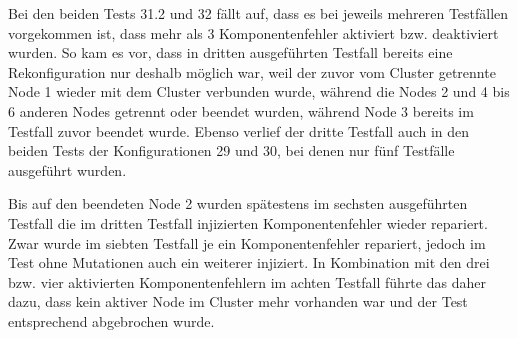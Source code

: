 Bei den beiden Tests 31.2 und 32 fällt auf, dass es bei jeweils mehreren Testfällen vorgekommen ist, dass mehr als 3 Komponentenfehler aktiviert bzw. deaktiviert wurden.
So kam es vor, dass \zB in dritten ausgeführten Testfall bereits eine Rekonfiguration nur deshalb möglich war, weil der zuvor vom Cluster getrennte Node 1 wieder mit dem Cluster verbunden wurde, während die Nodes 2 und 4 bis 6 anderen Nodes getrennt oder beendet wurden, während Node 3 bereits im Testfall zuvor beendet wurde.
Ebenso verlief der dritte Testfall auch in den beiden Tests der Konfigurationen 29 und 30, bei denen nur fünf Testfälle ausgeführt wurden.

Bis auf den beendeten Node 2 wurden spätestens im sechsten ausgeführten Testfall die im dritten Testfall injizierten Komponentenfehler wieder repariert.
Zwar wurde im siebten Testfall je ein Komponentenfehler repariert, jedoch im Test ohne Mutationen auch ein weiterer injiziert.
In Kombination mit den drei bzw. vier aktivierten Komponentenfehlern im achten Testfall führte das daher dazu, dass kein aktiver Node im Cluster mehr vorhanden war und der Test entsprechend abgebrochen wurde.
